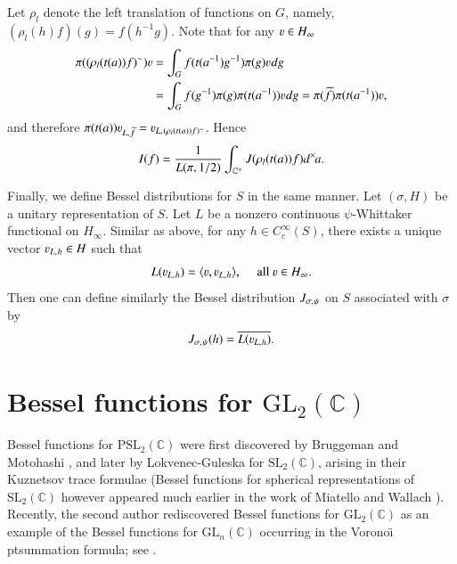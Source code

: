 \documentclass{amsproc}
\newcommand{\BC}{{\mathbb {C}}} \newcommand{\BD}{{\mathbb {D}}}
\newcommand{\GL}{{\mathrm {GL}}} \newcommand{\PGL}{{\mathrm {PGL}}}
\newcommand{\SL}{{\mathrm {SL}}} \newcommand{\PSL}{{\mathrm {PSL}}}
\def\-{^{-1}}
\def\BCx{\BC^{\times}}
\def\Voronoi{Vorono\" \i \hskip 3 pt}
\def\shskip{\hskip 0.5 pt}
\def\dx{d^{\times} \hskip -1 pt}
\theoremstyle{plain}
\numberwithin{equation}{section}
\begin{document}
	Let $\rho_l$ denote the left translation of functions on $G$, namely, $(\rho_l (h) f)(g) = f (h\- g)$. 
	Note that for any $\varv\in H_\infty$
	\begin{align*}
	\pi((\rho_l(t(a))f)^{\sim}) \varv 
	& =    \int_G f(t(a\-) g\-)\pi(g) \varv \shskip dg \\
	& =\int_G f(g\-)\pi(g)\pi(t(a\-)) \varv\shskip dg = \pi (\widetilde f) \pi (t(a\-)) \varv,
	\end{align*}
	and therefore $\pi(t(a))\varv_{L,\shskip\widetilde f}=\varv_{L,\shskip (\rho_l(t(a))f)^{\sim}}$. Hence
	\begin{equation}\label{eq: I(f) = int J}
	I(f)=\frac{1}{L(\pi,1/2)}\int_{\BCx}J(\rho_l(t(a))f)\dx a.
	\end{equation}
	
    Finally, we define   Bessel distributions for $S$ in the same manner. Let $(\sigma, H)$ be a   unitary representation of $S$. Let $L$ be a nonzero continuous $\psi$-Whittaker functional on $H_\infty$. Similar as above, for any $h\in C_c^\infty(S)$, there exists a unique vector $\varv_{L,\shskip  h} \in H$ such that
   \begin{equation}\label{def: v l phi, S}
    L (\varv_{L,\shskip h})=\langle \varv,\varv_{L,\shskip  h} \rangle, \hskip 10 pt \text{ all } \varv \in H_\infty.
   \end{equation}
    Then one can define similarly the Bessel distribution $J_{\sigma,\shskip \psi}$ on $S$ associated with $\sigma$ by
    \begin{equation}\label{def: J(phi), S}
    J_{\sigma,\shskip \psi}(h)=\overline {L (\varv_{L,\shskip h})}.
    \end{equation}



	\section{Bessel functions for $\GL_2 (\BC)$}\label{sec: def of Bessel j}
	
	
	
	Bessel functions for $\PSL_2 (\BC)$ were first discovered by  Bruggeman and Motohashi \cite{B-Mo}, and later by Lokvenec-Guleska \cite{B-Mo2} for $\SL_2 (\BC)$, arising in their  Kuznetsov trace formulae (Bessel functions for spherical representations of $\SL_2 (\BC)$ however appeared much earlier in the work of Miatello and Wallach \cite{M-W-Kuz}).  Recently, the second author rediscovered Bessel functions for $\GL_2 (\BC)$ as an example of the Bessel functions for $\GL_n (\BC)$ occurring in the \Voronoi summation formula; see \cite[\S 3, 15, 17, 18]{Qi-Bessel}. 
	
\end{document}
